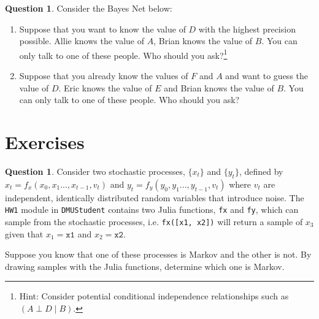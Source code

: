 \documentclass{article}
\theoremstyle{definition}
\newtheorem{question}[thm]{Question}
\begin{document}
\begin{samepage}
\begin{question}
    Consider the Bayes Net below:
\begin{center}
\end{center}

\begin{enumerate}[label=(\alph*)]
    \item Suppose that you want to know the value of $D$ with the highest precision possible. Allie knows the value of $A$, Brian knows the value of $B$. You can only talk to one of these people. Who should you ask?\footnote{Hint: Consider potential conditional independence relationships such as $(A \perp D \mid B)$.}
    \item Suppose that you already know the values of $F$ and $A$ and want to guess the value of $D$. Eric knows the value of $E$ and Brian knows the value of $B$. You can only talk to one of these people. Who should you ask?
\end{enumerate}
\end{question}
\end{samepage}

\section{Exercises}

\begin{question}
    Consider two stochastic processes, $\{x_t\}$ and $\{y_t\}$, defined by $x_t = f_x(x_{0}, x_{1}... , x_{t-1}, v_t)$ and $y_t = f_y(y_{0}, y_{1}... , y_{t-1}, v_t)$ where $v_t$ are independent, identically distributed random variables that introduce noise. The \texttt{HW1} module in \texttt{DMUStudent} contains two Julia functions, \texttt{fx} and \texttt{fy}, which can sample from the stochastic processes, i.e. \texttt{fx([x1, x2])} will return a sample of $x_3$ given that $x_1 = \texttt{x1}$ and $x_2 = \texttt{x2}$.

    Suppose you know that one of these processes is Markov and the other is not. By drawing samples with the Julia functions, determine which one is Markov.
\end{question}
\end{document}
